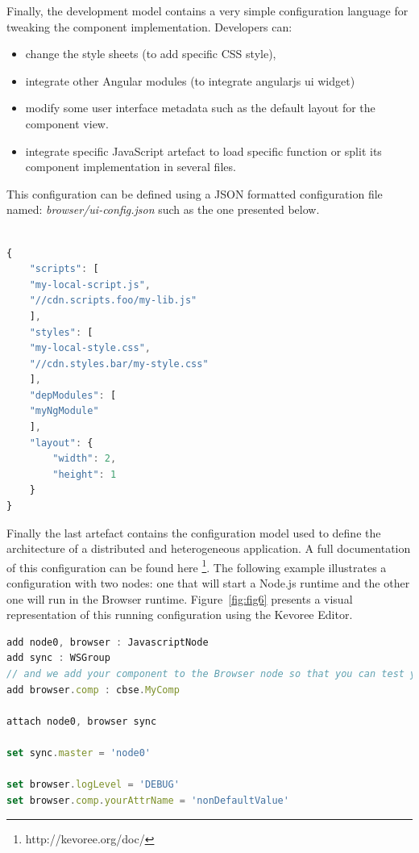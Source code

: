 Finally, the development model contains a very simple configuration language for tweaking the component implementation. Developers can: 

\begin{itemize}
	\item change the style sheets (to add specific CSS style), 
	\item integrate other Angular modules (to integrate angularjs ui widget)  
	\item modify some user interface metadata such as the default layout for the component view. 
	\item integrate specific JavaScript artefact to load specific function or split its component implementation in several files. 
	\end{itemize}
 
 
This configuration can be defined using a JSON formatted configuration file named: \emph{browser/ui-config.json} such as the one presented below.
 
\begin{lstlisting}[language=JavaScript,numbers=right,firstnumber=1,basicstyle=\scriptsize,deletekeywords={port}]

{
	"scripts": [
	"my-local-script.js",
	"//cdn.scripts.foo/my-lib.js"
	],
	"styles": [
	"my-local-style.css",
	"//cdn.styles.bar/my-style.css"
	],
	"depModules": [
	"myNgModule"
	],
	"layout": {
		"width": 2,
		"height": 1
	}
}
\end{lstlisting}

Finally the last artefact contains the configuration model used to define the architecture of a distributed and heterogeneous application. A full documentation of this configuration can be found here \footnote{http://kevoree.org/doc/}. The following example  illustrates a configuration with two nodes: one that will start a Node.js runtime  and the other one will run in the Browser runtime. Figure~\ref{fig:fig6} presents a visual representation of this running configuration using the Kevoree Editor. 


\begin{lstlisting}[language=JavaScript,numbers=right,firstnumber=1,basicstyle=\scriptsize,morekeywords={add,attach,set,network}]
add node0, browser : JavascriptNode
add sync : WSGroup
// and we add your component to the Browser node so that you can test your UI
add browser.comp : cbse.MyComp

attach node0, browser sync

set sync.master = 'node0'

set browser.logLevel = 'DEBUG'
set browser.comp.yourAttrName = 'nonDefaultValue'

\end{lstlisting}

